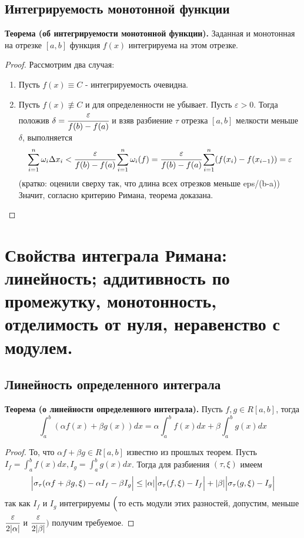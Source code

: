 \documentclass{article}
\newcommand*{\theorem}[2]{\textbf{Теорема #1. } #2 \newline}
\newcommand*{\eps}{\varepsilon}
\begin{document}
\subsection{Интегрируемость монотонной функции}
\theorem{(об интегрируемости монотонной функции)}{Заданная и монотонная на отрезке $[a, b]$ функция $f(x)$ интегрируема на этом отрезке.}
\begin{proof}
    Рассмотрим два случая:
    \begin{enumerate}
        \item Пусть $f(x) \equiv C$ -  интегрируемость очевидна.
        \item Пусть $f(x) \not \equiv C$ и для определенности не убывает. Пусть $\eps > 0$. Тогда положив $\delta = \cfrac{\eps}{f(b) - f(a)}$ и взяв разбиение $\tau$ отрезка $[a, b]$ мелкости меньше $\delta$, выполняется 
        $$
            \sum_{i = 1}^{n} \omega_i \Delta x_i < \cfrac{\eps}{f(b) - f(a)}\sum_{i = 1}^{n}\omega_i(f) = \cfrac{\eps}{f(b) - f(a)}\sum_{i = 1}^{n}(f(x_i) - f(x_{i-1})) = \eps
        $$
        (кратко: оценили сверху так, что длина всех отрезков меньше eps/(b-a)) \newline 
        Значит, согласно критерию Римана, теорема доказана.
    \end{enumerate}
\end{proof}
\section{Свойства интеграла Римана: линейность; аддитивность по промежутку, монотонность, отделимость от нуля, неравенство с модулем.}
\subsection{Линейность определенного интеграла}
\theorem{(о линейности определенного интеграла)}{Пусть $f, g \in R[a, b]$, тогда}
$$
    \int_{a}^{b} (\alpha f(x) + \beta g(x))dx = \alpha \int_{a}^{b}f(x)dx + \beta \int_{a}^{b} g(x)dx
$$
\begin{proof}
    То, что $\alpha f + \beta g \in R[a, b]$ известно из прошлых теорем. Пусть $I_f = \int_{a}^{b} f(x)dx, I_g = \int_{a}^{b} g(x)dx$. Тогда для разбиения $(\tau, \xi)$ имеем
    $$
        \Bigl| \sigma_\tau(\alpha f + \beta g, \xi) - \alpha I_f - \beta I_g \Bigr| \leq |\alpha| \Bigl| \sigma_\tau(f, \xi) - I_f \Bigr| + |\beta| \Bigl| \sigma_\tau(g, \xi) - I_g \Bigr|
    $$  
    так как $I_f$ и $I_g$ интегрируемы $\Bigl($то есть модули этих разностей, допустим, меньше $\cfrac{\eps}{2|\alpha|}$ и $\cfrac{\eps}{2|\beta|}$$\Bigr)$ получим требуемое.
\end{proof}
\end{document}
